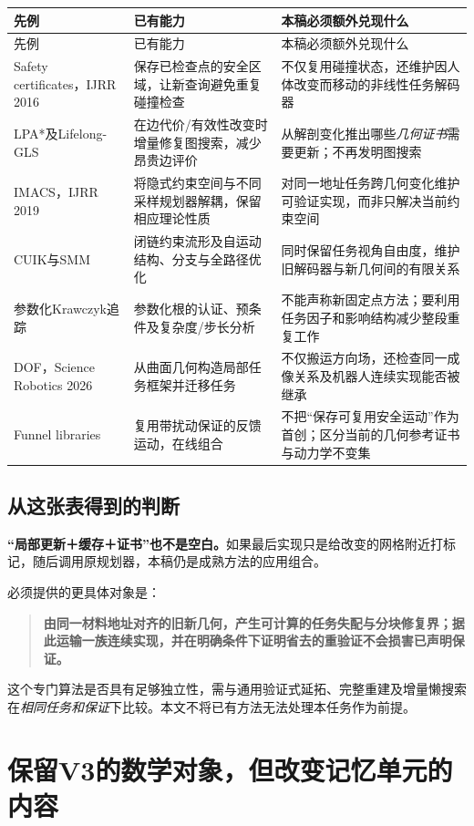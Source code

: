 \documentclass[UTF8,11pt,a4paper,fontset=fandol]{ctexart}
\numberwithin{equation}{section}
\theoremstyle{definition}
\begin{document}
\begin{longtable}{p{}p{}p{}}
\toprule 先例 & 已有能力 & 本稿必须额外兑现什么\\\midrule\endfirsthead
\toprule 先例 & 已有能力 & 本稿必须额外兑现什么\\\midrule\endhead
Safety certificates，IJRR 2016\cite{safetycert} & 保存已检查点的安全区域，让新查询避免重复碰撞检查 & 不仅复用碰撞状态，还维护因人体改变而移动的非线性任务解码器\\
LPA*及Lifelong-GLS\cite{lpa,lgls} & 在边代价/有效性改变时增量修复图搜索，减少昂贵边评价 & 从解剖变化推出哪些\emph{几何证书}需要更新；不再发明图搜索\\
IMACS，IJRR 2019\cite{imacs} & 将隐式约束空间与不同采样规划器解耦，保留相应理论性质 & 对同一地址任务跨几何变化维护可验证实现，而非只解决当前约束空间\\
CUIK与SMM\cite{cuik,smm} & 闭链约束流形及自运动结构、分支与全路径优化 & 同时保留任务视角自由度，维护旧解码器与新几何间的有限关系\\
参数化Krawczyk追踪\cite{dufflee,lee} & 参数化根的认证、预条件及复杂度/步长分析 & 不能声称新固定点方法；要利用任务因子和影响结构减少整段重复工作\\
DOF，Science Robotics 2026\cite{dof} & 从曲面几何构造局部任务框架并迁移任务 & 不仅搬运方向场，还检查同一成像关系及机器人连续实现能否被继承\\
Funnel libraries\cite{funnel} & 复用带扰动保证的反馈运动，在线组合 & 不把“保存可复用安全运动”作为首创；区分当前的几何参考证书与动力学不变集\\\bottomrule
\end{longtable}

\subsection{从这张表得到的判断}
\textbf{“局部更新＋缓存＋证书”也不是空白。}如果最后实现只是给改变的网格附近打标记，随后调用原规划器，本稿仍是成熟方法的应用组合。

必须提供的更具体对象是：
\begin{quote}
\textbf{由同一材料地址对齐的旧新几何，产生可计算的任务失配与分块修复界；据此运输一族连续实现，并在明确条件下证明省去的重验证不会损害已声明保证。}
\end{quote}
这个专门算法是否具有足够独立性，需与通用验证式延拓、完整重建及增量懒搜索在\emph{相同任务和保证}下比较。本文不将已有方法无法处理本任务作为前提。

\section{保留V3的数学对象，但改变记忆单元的内容}
\end{document}

